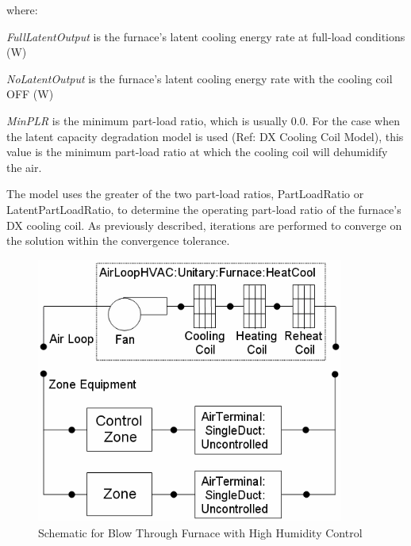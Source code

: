 where:

\emph{FullLatentOutput} is the furnace's latent cooling energy rate at full-load conditions (W)

\emph{NoLatentOutput} is the furnace's latent cooling energy rate with the cooling coil OFF (W)

\emph{MinPLR} is the minimum part-load ratio, which is usually 0.0. For the case when the latent capacity degradation model is used (Ref: DX Cooling Coil Model), this value is the minimum part-load ratio at which the cooling coil will dehumidify the air.

The model uses the greater of the two part-load ratios, PartLoadRatio or LatentPartLoadRatio, to determine the operating part-load ratio of the furnace's DX cooling coil. As previously described, iterations are performed to converge on the solution within the convergence tolerance.

\begin{figure}[hbtp] %
\centering
\includegraphics[width=0.9\textwidth, height=0.9\textheight, keepaspectratio=true]{media/image5049.png}
\caption{Schematic for Blow Through Furnace with High Humidity Control \protect \label{fig:schematic-for-blow-through-furnace-with-high}}
\end{figure}

